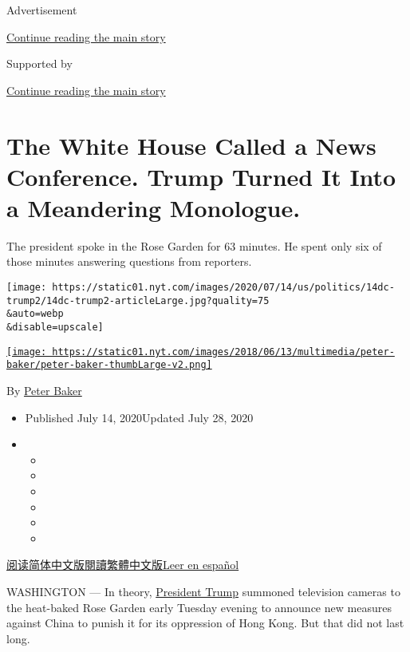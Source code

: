 Advertisement

\protect\hyperlink{after-top}{Continue reading the main story}

Supported by

\protect\hyperlink{after-sponsor}{Continue reading the main story}

\hypertarget{the-white-house-called-a-news-conference-trump-turned-it-into-a-meandering-monologue}{%
\section{The White House Called a News Conference. Trump Turned It Into
a Meandering
Monologue.}\label{the-white-house-called-a-news-conference-trump-turned-it-into-a-meandering-monologue}}

The president spoke in the Rose Garden for 63 minutes. He spent only six
of those minutes answering questions from reporters.

\texttt{[image: https://static01.nyt.com/images/2020/07/14/us/politics/14dc-trump2/14dc-trump2-articleLarge.jpg?quality=75\\\&auto=webp\\\&disable=upscale]}

\href{https://www.nytimes.com/by/peter-baker}{\texttt{[image: https://static01.nyt.com/images/2018/06/13/multimedia/peter-baker/peter-baker-thumbLarge-v2.png]}}

By \href{https://www.nytimes.com/by/peter-baker}{Peter Baker}

\begin{itemize}
\item
  Published July 14, 2020Updated July 28, 2020
\item
  \begin{itemize}
  \item
  \item
  \item
  \item
  \item
  \item
  \end{itemize}
\end{itemize}

\href{https://cn.nytimes.com/usa/20200715/trump-news-conference/}{阅读简体中文版}\href{https://cn.nytimes.com/usa/20200715/trump-news-conference/zh-hant/}{閱讀繁體中文版}\href{https://www.nytimes.com/es/2020/07/15/espanol/estados-unidos/trump-conferencia-prensa.html}{Leer
en español}

WASHINGTON --- In theory,
\href{https://www.nytimes.com/2020/07/28/us/politics/donald-fred-trump.html}{President
Trump} summoned television cameras to the heat-baked Rose Garden early
Tuesday evening to announce new measures against China to punish it for
its oppression of Hong Kong. But that did not last long.

